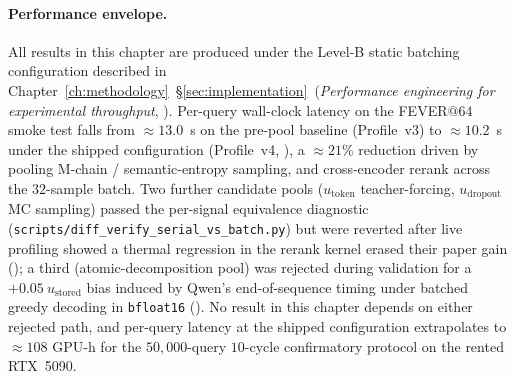 \paragraph{Performance envelope.}
All results in this chapter are produced under the Level-B static
batching configuration described in
Chapter~\ref{ch:methodology}~\S\ref{sec:implementation}~(\emph{Performance
engineering for experimental throughput}, ).
Per-query wall-clock latency on the FEVER$@64$ smoke test falls from
$\approx 13.0$~s on the pre-pool baseline (Profile~v3) to
$\approx 10.2$~s under the shipped configuration (Profile~v4,
), a $\approx 21\%$ reduction driven
by pooling M-chain / semantic-entropy sampling, and cross-encoder
rerank across the $32$-sample batch. Two further candidate pools
($u_{\text{token}}$ teacher-forcing, $u_{\text{dropout}}$ MC
sampling) passed the per-signal equivalence diagnostic
(\texttt{scripts/diff\_verify\_serial\_vs\_batch.py}) but were
reverted after live profiling showed a thermal regression in the
rerank kernel erased their paper gain
(); a third (atomic-decomposition
pool) was rejected during validation for a
$+0.05\ u_{\text{stored}}$ bias induced by Qwen's end-of-sequence
timing under batched greedy decoding in \texttt{bfloat16}
(). No result in this chapter
depends on either rejected path, and per-query latency at the
shipped configuration extrapolates to $\approx 108$ GPU-h for the
$50{,}000$-query $10$-cycle confirmatory protocol on the rented
RTX~5090.

